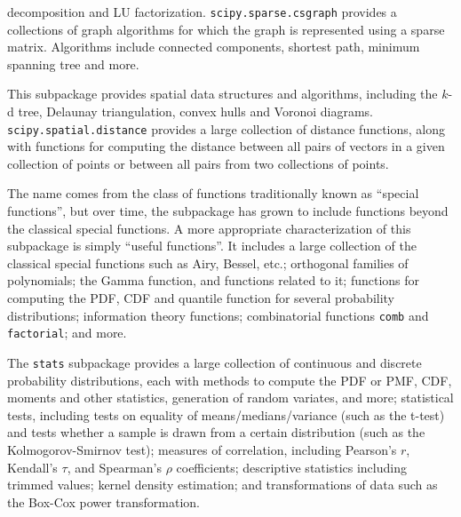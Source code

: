 \begin{description}[leftmargin=!, labelwidth=\widthof{\bfseries \texttt{interpolate}}]
		decomposition and LU factorization.
    \texttt{scipy.sparse.csgraph} provides a collections of graph algorithms
    for which the graph is represented using a sparse matrix.  Algorithms
    include connected components, shortest path, minimum spanning tree
    and more.
\item[\texttt{spatial}]
    This subpackage provides spatial data structures and algorithms,
    including the $k$-d tree, Delaunay triangulation, convex hulls and Voronoi
    diagrams. \texttt{scipy.spatial.distance} provides
    a large collection of distance functions, along with functions for
    computing the distance between all pairs of vectors in a given collection
    of points or between all pairs from two collections of points.
\item[\texttt{special}]
    The name comes from the class of functions traditionally known as ``special
    functions'', but over time, the subpackage has grown to include functions
    beyond the classical special functions.  A more appropriate characterization
    of this subpackage is simply ``useful functions''.
    It includes a large collection of the classical special functions
    such as Airy, Bessel, etc.; orthogonal families of polynomials;
    the Gamma function, and functions related to it;
    functions for computing the PDF, CDF and quantile function for several
    probability distributions;
    information theory functions;
    combinatorial functions \texttt{comb} and \texttt{factorial};
    and more.
\item[\texttt{stats}]
    The \texttt{stats} subpackage provides a large collection of continuous
    and discrete probability distributions, each with methods to compute
    the PDF or PMF, CDF, moments and other statistics, generation of random
    variates, and more;
    statistical tests, including tests on equality of means/medians/variance
    (such as the t-test) and tests whether a sample is drawn from a
    certain distribution (such as the Kolmogorov-Smirnov test);
    measures of correlation, including Pearson's $r$, Kendall's $\tau$, and
    Spearman's $\rho$ coefficients;
    descriptive statistics including trimmed values;
    kernel density estimation;
    and transformations of data such as the Box-Cox power transformation.
\end{description}

